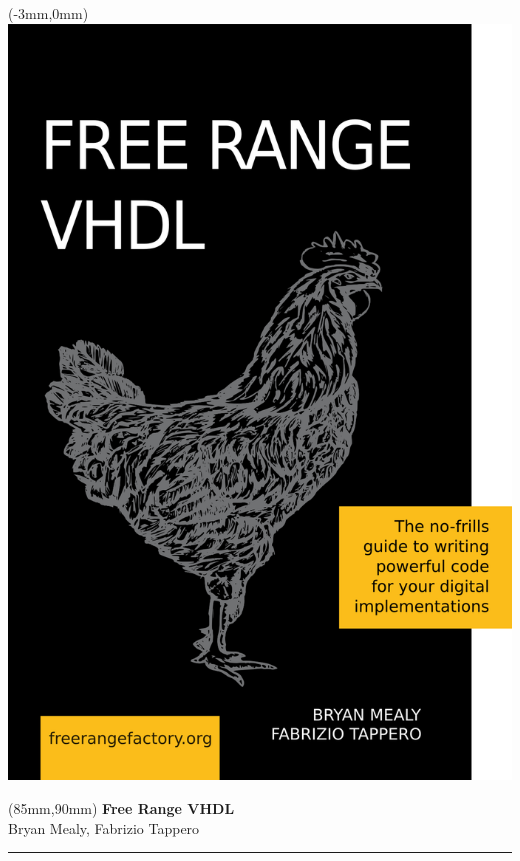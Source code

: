\documentclass[11pt,b5paper]{book} %
\begin{document}
	
	\thispagestyle{empty}
	\begin{textblock*}{160mm}(-3mm,0mm)
    \includegraphics[width=160mm]{pics/cover.png}  %
	\end{textblock*}
	\null\newpage %

	\thispagestyle{empty}
	\null\newpage

	\thispagestyle{empty}
	\begin{textblock*}{60mm}(85mm,90mm)
	\noindent
	{\sffamily\LARGE\bfseries Free Range VHDL}\\
	\noindent
	{\sffamily\small Bryan Mealy, Fabrizio Tappero}\\
	{\color{dark-gray}\rule[5pt]{170pt}{3pt}}
	\end{textblock*}
	\null\newpage
\end{document}
